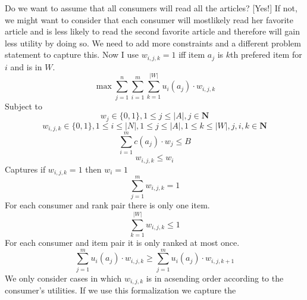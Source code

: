 \documentclass[10pt,a4paper]{article}
\begin{document}
Do we want to assume that all consumers will read all the articles? [Yes!] If not, we might want to consider that each consumer will mostlikely read her favorite article and is less likely to read the second favorite article and therefore will gain less utility by doing so. We need to add more constraints and a different problem statement to capture this. Now I use $w_{i,j,k} = 1$ iff item $a_j$ is $k$th prefered item for $i$ and is in $W$.
\begin{equation}
\max \sum_{j=1}^n \sum_{i=1}^m \sum_{k=1}^{|W|}u_i(a_j)\cdot w_{i,j,k}
\end{equation}
Subject to
\begin{equation}
w_j \in \{0,1\}, 1 \leq j \leq |A|, j \in \mathbf{N}
\end{equation}
\begin{equation}
w_{i,j,k} \in \{0,1\}, 1 \leq i \leq |N|, 1 \leq j \leq |A|, 1 \leq k \leq |W|, j,i,k \in \mathbf{N} 
\end{equation}
\begin{equation}
\sum_{i=1}^m c(a_j)\cdot w_j \leq B 
\end{equation}
\begin{equation}
w_{i,j,k} \leq w_i
\end{equation}
Captures if $w_{i,j,k}=1$ then $w_i=1$
\begin{equation}
\sum_{j=1}^{m} w_{i,j,k}=1
\end{equation}
For each consumer and rank pair there is only one item.
\begin{equation}
\sum_{k=1}^{|W|} w_{i,j,k}\leq 1
\end{equation}
For each consumer and item pair it is only ranked at most once.
\begin{equation}
\sum_{j=1}^{m} u_i(a_j)\cdot w_{i,j,k} \geq \sum_{j=1}^{m} u_i(a_j)\cdot w_{i,j,k+1}
\end{equation}
We only consider cases in which $w_{i,j,k}$ is in acsending order according to the consumer's utilities. If we use this formalization we capture the
\end{document}
